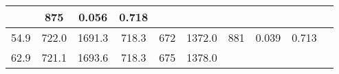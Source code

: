 \documentclass[a4paper,10pt]{article}
\begin{document}
\begin{longtable}{
     |
%    
    c|
%    
    c|
%    
    c|
%    
    c|
%    
    c|
%    
    c|
%    
    c|
%    
    c|
%    
    c|
%    
    c|
%    
    }
%        
        & 875
%        

%        

%        
        & 0.056
%        

%        

%        
        & 0.718
%        

%        
        \\
        \hline

        

%        

%        
        54.9
%        

%        

%        
        & 722.0
%        

%        

%        
        & 1691.3
%        

%        

%        
        & 718.3
%        

%        

%        
        & 672
%        

%        

%        
        & 1372.0
%        

%        

%        
        & 881
%        

%        

%        
        & 0.039
%        

%        

%        
        & 0.713
%        

%        
        \\
        \hline

        

%        

%        
        62.9
%        

%        

%        
        & 721.1
%        

%        

%        
        & 1693.6
%        

%        

%        
        & 718.3
%        

%        

%        
        & 675
%        

%        

%        
        & 1378.0
%        

%        


\end{longtable}
\end{document}
